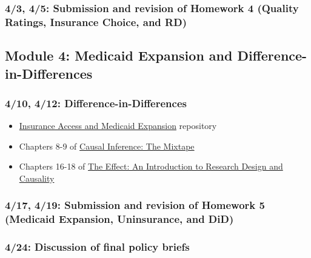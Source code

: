 \documentclass[11pt,]{article}
\providecommand{\tightlist}{%
  \setlength{\itemsep}{0pt}\setlength{\parskip}{0pt}}
\begin{document}
\hypertarget{submission-and-revision-of-homework-4-quality-ratings-insurance-choice-and-rd}{%
\subsubsection{4/3, 4/5: Submission and revision of Homework 4 (Quality
Ratings, Insurance Choice, and
RD)}\label{submission-and-revision-of-homework-4-quality-ratings-insurance-choice-and-rd}}

\hypertarget{module-4-medicaid-expansion-and-difference-in-differences}{%
\subsection{Module 4: Medicaid Expansion and
Difference-in-Differences}\label{module-4-medicaid-expansion-and-difference-in-differences}}

\hypertarget{difference-in-differences}{%
\subsubsection{4/10, 4/12:
Difference-in-Differences}\label{difference-in-differences}}

\begin{itemize}
\tightlist
\item
  \href{https://github.com/imccart/Insurance-Access}{Insurance Access
  and Medicaid Expansion} repository
\item
  Chapters 8-9 of \href{https://mixtape.scunning.com/}{Causal Inference:
  The Mixtape}
\item
  Chapters 16-18 of \href{https://theeffectbook.net/}{The Effect: An
  Introduction to Research Design and Causality}
\end{itemize}

\hypertarget{submission-and-revision-of-homework-5-medicaid-expansion-uninsurance-and-did}{%
\subsubsection{4/17, 4/19: Submission and revision of Homework 5
(Medicaid Expansion, Uninsurance, and
DiD)}\label{submission-and-revision-of-homework-5-medicaid-expansion-uninsurance-and-did}}

\hypertarget{discussion-of-final-policy-briefs}{%
\subsubsection{4/24: Discussion of final policy
briefs}\label{discussion-of-final-policy-briefs}}
\end{document}
